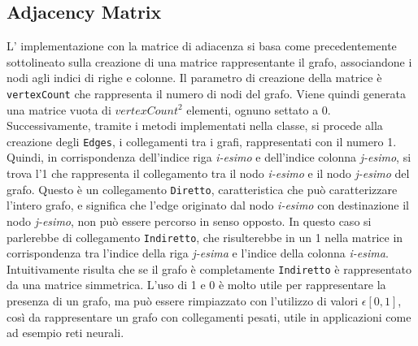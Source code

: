 \documentclass{article}
\begin{document}
\subsection{Adjacency Matrix}
L' implementazione con la matrice di adiacenza si basa come precedentemente sottolineato sulla creazione di una matrice rappresentante il grafo, associandone i nodi agli indici di righe e colonne. \newline
Il parametro di creazione della matrice \`e \texttt{vertexCount} che rappresenta il numero di nodi del grafo. Viene quindi generata una matrice vuota di $vertexCount^2$ elementi, ognuno settato a \textrm{0}. \newline
Successivamente, tramite i metodi implementati nella classe, si procede alla creazione degli \texttt{Edges}, i collegamenti tra i grafi, rappresentati con il numero \textrm{1}. Quindi, in corrispondenza dell'indice riga \textit{i-esimo} e dell'indice colonna \textit{j-esimo}, si trova l'\textrm{1} che rappresenta il collegamento tra il nodo \textit{i-esimo} e il nodo \textit{j-esimo} del grafo. \newline
Questo \`e un collegamento \texttt{Diretto}, caratteristica che pu\`o caratterizzare l'intero grafo, e significa che l'edge originato dal nodo \textit{i-esimo} con destinazione il nodo \textit{j-esimo}, non pu\`o essere percorso in senso opposto. In questo caso si parlerebbe di collegamento \texttt{Indiretto}, che risulterebbe in un \textrm{1} nella matrice in corrispondenza tra l'indice della riga \textit{j-esima} e l'indice della colonna \textit{i-esima}. Intuitivamente risulta che se il grafo \`e completamente \texttt{Indiretto} \`e rappresentato da una matrice simmetrica. \newline
L'uso di \textrm{1} e \textrm{0} \`e molto utile per rappresentare la presenza di un grafo, ma pu\`o essere rimpiazzato con l'utilizzo di valori $\epsilon [0,1]$, cos\`i da rappresentare un grafo con collegamenti pesati, utile in applicazioni come ad esempio reti neurali. \newline
\end{document}

